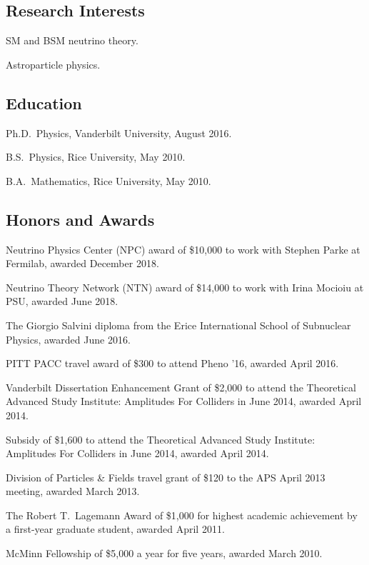 \documentclass{article}
\renewenvironment{itemize}{
\begin{list}{}{
\setlength{\leftmargin}{.5em}}}{
\end{list}}
\begin{document}
\subsection*{Research Interests}
\begin{itemize}
\item SM and BSM neutrino theory.
\item Astroparticle physics.
\end{itemize}

\subsection*{Education}
\begin{itemize}
\item Ph.D.~Physics, Vanderbilt University, August 2016.
\item B.S.~Physics, Rice University, May 2010.
\item B.A.~Mathematics, Rice University, May 2010.
\end{itemize}

\subsection*{Honors and Awards}
\begin{itemize}
\item Neutrino Physics Center (NPC) award of \$10,000 to work with Stephen Parke at Fermilab, awarded December 2018.
\item Neutrino Theory Network (NTN) award of \$14,000 to work with Irina Mocioiu at PSU, awarded June 2018.
\item The Giorgio Salvini diploma from the Erice International School of Subnuclear Physics, awarded June 2016.
\item PITT PACC travel award of \$300 to attend Pheno '16, awarded April 2016.
\item Vanderbilt Dissertation Enhancement Grant of \$2,000 to attend the Theoretical Advanced Study Institute: Amplitudes For Colliders
in June 2014, awarded April 2014.
\item Subsidy of \$1,600 to attend the Theoretical Advanced Study Institute: Amplitudes For Colliders in June 2014, awarded April 2014.
\item Division of Particles \& Fields travel grant of \$120 to the APS April 2013 meeting, awarded March 2013.
\item The Robert T.~Lagemann Award of \$1,000 for highest academic achievement by a first-year graduate student, awarded April 2011.
\item McMinn Fellowship of \$5,000 a year for five years, awarded March 2010.
\end{itemize}
\end{document}
